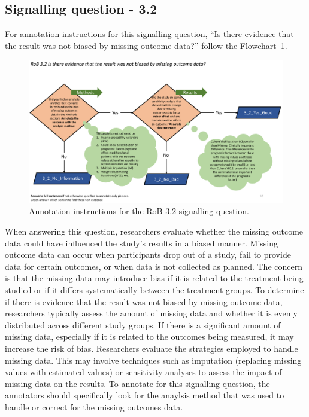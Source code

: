 \documentclass[sn-mathphys,Numbered]{sn-jnl}%
\begin{document}
\subsection*{Signalling question - 3.2 }
%
For annotation instructions for this signalling question, ``Is there evidence that the result was not biased by missing outcome data?'' follow the Flowchart~\ref{fig:3_2}.
%
\begin{figure}[hbt]
    \centering
    \includegraphics[width=\textwidth]{figures/3_2.pdf}
    \caption{Annotation instructions for the RoB 3.2 signalling question.}
    \label{fig:3_2}
\end{figure}
%
When answering this question, researchers evaluate whether the missing outcome data could have influenced the study's results in a biased manner.
Missing outcome data can occur when participants drop out of a study, fail to provide data for certain outcomes, or when data is not collected as planned.
The concern is that the missing data may introduce bias if it is related to the treatment being studied or if it differs systematically between the treatment groups.
To determine if there is evidence that the result was not biased by missing outcome data, researchers typically assess the amount of missing data and whether it is evenly distributed across different study groups.
If there is a significant amount of missing data, especially if it is related to the outcomes being measured, it may increase the risk of bias.
Researchers evaluate the strategies employed to handle missing data.
This may involve techniques such as imputation (replacing missing values with estimated values) or sensitivity analyses to assess the impact of missing data on the results.
To annotate for this signalling question, the annotators should specifically look for the anaylsis method that was used to handle or correct for the missing outcomes data.
\end{document}
